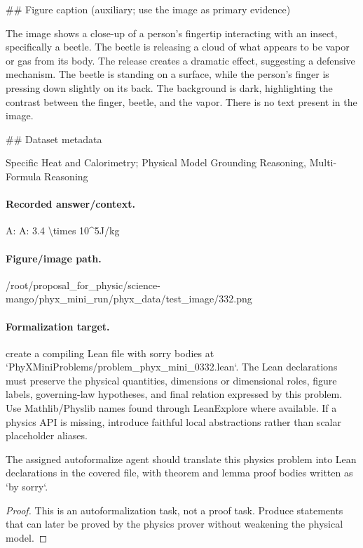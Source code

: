 \#\# Figure caption (auxiliary; use the image as primary evidence)

The image shows a close-up of a person's fingertip interacting with an insect, specifically a beetle. The beetle is releasing a cloud of what appears to be vapor or gas from its body. The release creates a dramatic effect, suggesting a defensive mechanism. The beetle is standing on a surface, while the person's finger is pressing down slightly on its back. The background is dark, highlighting the contrast between the finger, beetle, and the vapor. There is no text present in the image.

\#\# Dataset metadata

Specific Heat and Calorimetry; Physical Model Grounding Reasoning, Multi-Formula Reasoning

\paragraph{Recorded answer/context.}
A: A: 3.4 \textbackslash{}times 10\textasciicircum{}5J/kg

\paragraph{Figure/image path.}
/root/proposal\_for\_physic/science-mango/phyx\_mini\_run/phyx\_data/test\_image/332.png

\paragraph{Formalization target.}
create a compiling Lean file with sorry bodies at `PhyXMiniProblems/problem\_phyx\_mini\_0332.lean`. The Lean declarations must preserve the physical quantities, dimensions or dimensional roles, figure labels, governing-law hypotheses, and final relation expressed by this problem.
Use Mathlib/Physlib names found through LeanExplore where available. If a physics API is missing, introduce faithful local abstractions rather than scalar placeholder aliases.

\begin{theorem}
\label{thm:physics:phyx_mini_0332:target}
The assigned autoformalize agent should translate this physics problem into Lean declarations in the covered file, with theorem and lemma proof bodies written as `by sorry`.
\end{theorem}
\begin{proof}
This is an autoformalization task, not a proof task. Produce statements that can later be proved by the physics prover without weakening the physical model.
\end{proof}

